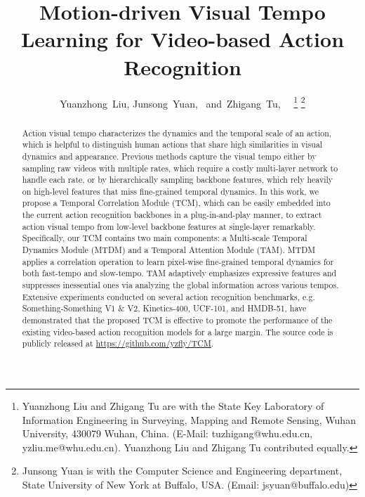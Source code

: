 \documentclass[journal]{IEEEtran}
\begin{document}
\title{Motion-driven Visual Tempo Learning for Video-based Action Recognition}

\author{Yuanzhong~Liu,
Junsong~Yuan,~
and~Zhigang~Tu,~
\
\thanks{Yuanzhong Liu and Zhigang Tu are with the State Key Laboratory of Information Engineering in Surveying, Mapping and Remote Sensing, Wuhan University, 430079 Wuhan, China. (E-Mail: tuzhigang@whu.edu.cn, yzliu.me@whu.edu.cn). Yuanzhong Liu and Zhigang Tu contributed equally.}
\thanks{Junsong Yuan is with the Computer Science and Engineering department, State University of New York at Buffalo, USA. (Email: jsyuan@buffalo.edu)}
}


\maketitle

\begin{abstract}
Action visual tempo characterizes the dynamics and the temporal scale of an action, which is helpful to distinguish human actions that share high similarities in visual dynamics and appearance. Previous methods capture the visual tempo either by sampling raw videos with multiple rates, which require a costly multi-layer network to handle each rate, or by hierarchically sampling backbone features, which rely heavily on high-level features that miss fine-grained temporal dynamics. In this work, we propose a Temporal Correlation Module (TCM), which can be easily embedded into the current action recognition backbones in a plug-in-and-play manner, to extract action visual tempo from low-level backbone features at single-layer remarkably. Specifically, our TCM contains two main components: a Multi-scale Temporal Dynamics Module (MTDM) and a Temporal Attention Module (TAM). MTDM applies a correlation operation to learn pixel-wise fine-grained temporal dynamics for both fast-tempo and slow-tempo. TAM adaptively emphasizes expressive features and suppresses inessential ones via analyzing the global information across various tempos. Extensive experiments conducted on several action recognition benchmarks, e.g. Something-Something V1 $\&$ V2, Kinetics-400, UCF-101, and HMDB-51, have demonstrated that the proposed TCM is effective to promote the performance of the existing video-based action recognition models for a large margin. The source code is publicly released at \url{https://github.com/yzfly/TCM}.
\end{abstract}
\end{document}
